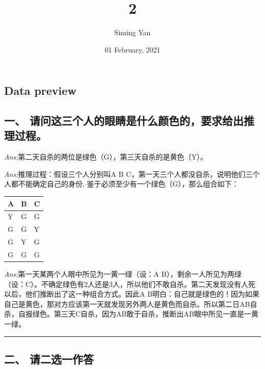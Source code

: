 \documentclass[
]{article}
\title{2}
\author{Siming Yan}
\date{01 February, 2021}
\begin{document}
\maketitle

\hypertarget{data-preview}{%
\subsection{Data preview}\label{data-preview}}

\hypertarget{ux4e00-ux8bf7ux95eeux8fd9ux4e09ux4e2aux4ebaux7684ux773cux775bux662fux4ec0ux4e48ux989cux8272ux7684ux8981ux6c42ux7ed9ux51faux63a8ux7406ux8fc7ux7a0b}{%
\subsection{一、
请问这三个人的眼睛是什么颜色的，要求给出推理过程。}\label{ux4e00-ux8bf7ux95eeux8fd9ux4e09ux4e2aux4ebaux7684ux773cux775bux662fux4ec0ux4e48ux989cux8272ux7684ux8981ux6c42ux7ed9ux51faux63a8ux7406ux8fc7ux7a0b}}

{\emph{Ans:}第二天自杀的两位是绿色（G），第三天自杀的是黄色（Y）。}

{\emph{Ans:}推理过程：假设三个人分别叫A B
C，第一天三个人都没自杀，说明他们三个人都不能确定自己的身份,
鉴于必须至少有一个绿色（G），那么组合如下：}

\begin{longtable}[]{@{}lll@{}}
\toprule
A & B & C\tabularnewline
\midrule
\endhead
Y & G & G\tabularnewline
G & G & Y\tabularnewline
G & Y & G\tabularnewline
G & G & G\tabularnewline
\bottomrule
\end{longtable}

\emph{Ans:}第一天某两个人眼中所见为一黄一绿（设：A
B），剩余一人所见为两绿（设：C）。不确定绿色有2人还是3人，所以他们不敢自杀。第二天发现没有人死以后，他们推断出了这一种组合方式。因此A
B明白：自己就是绿色的！因为如果自己是黄色，那对方应该第一天就发现另外两人是黄色而自杀。所以第二日AB自杀，自报绿色。第三天C自杀，因为AB敢于自杀，推断出AB眼中所见一直是一黄一绿。

\begin{center}\rule{0.5\linewidth}{0.5pt}\end{center}

\hypertarget{ux4e8c-ux8bf7ux4e8cux9009ux4e00ux4f5cux7b54}{%
\subsection{二、
请二选一作答}\label{ux4e8c-ux8bf7ux4e8cux9009ux4e00ux4f5cux7b54}}
\end{document}
